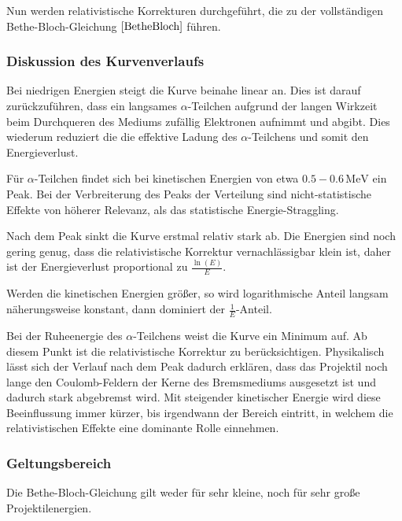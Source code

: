 \documentclass[12pt,a4paper]{scrartcl}
\numberwithin{equation}{section} %
\renewcommand{\[}{} %
\renewcommand{\]}{\noindent} %
\begin{document}
Nun werden relativistische Korrekturen durchgeführt, die zu der
vollständigen Bethe-Bloch-Gleichung \(\eqref{BetheBloch}\) führen.

\hypertarget{diskussion-des-kurvenverlaufs}{%
\subsubsection{Diskussion des
Kurvenverlaufs}\label{diskussion-des-kurvenverlaufs}}

Bei niedrigen Energien steigt die Kurve beinahe linear an. Dies ist
darauf zurückzuführen, dass ein langsames \(\alpha\)-Teilchen aufgrund
der langen Wirkzeit beim Durchqueren des Mediums zufällig Elektronen
aufnimmt und abgibt. Dies wiederum reduziert die die effektive Ladung
des \(\alpha\)-Teilchens und somit den Energieverlust.

Für \(\alpha\)-Teilchen findet sich bei kinetischen Energien von etwa
\(0.5-0.6\mathrm{\,MeV}\) ein Peak. Bei der Verbreiterung des Peaks der
Verteilung sind nicht-statistische Effekte von höherer Relevanz, als das
statistische Energie-Straggling.

Nach dem Peak sinkt die Kurve erstmal relativ stark ab. Die Energien
sind noch gering genug, dass die relativistische Korrektur
vernachlässigbar klein ist, daher ist der Energieverlust proportional zu
\(\frac{\ln(E)}{E}\).

Werden die kinetischen Energien größer, so wird logarithmische Anteil
langsam näherungsweise konstant, dann dominiert der
\(\frac{1}{E}\)-Anteil.

Bei der Ruheenergie des \(\alpha\)-Teilchens weist die Kurve ein Minimum
auf. Ab diesem Punkt ist die relativistische Korrektur zu
berücksichtigen. Physikalisch lässt sich der Verlauf nach dem Peak
dadurch erklären, dass das Projektil noch lange den Coulomb-Feldern der
Kerne des Bremsmediums ausgesetzt ist und dadurch stark abgebremst wird.
Mit steigender kinetischer Energie wird diese Beeinflussung immer
kürzer, bis irgendwann der Bereich eintritt, in welchem die
relativistischen Effekte eine dominante Rolle einnehmen.

\hypertarget{geltungsbereich}{%
\subsubsection{Geltungsbereich}\label{geltungsbereich}}

Die Bethe-Bloch-Gleichung gilt weder für sehr kleine, noch für sehr
große Projektilenergien.
\end{document}

